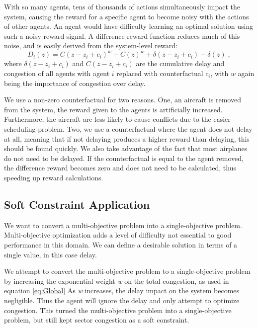 \documentclass{aamas2014}
\begin{document}
With so many agents, tens of thousands of actions simultaneously impact the system, causing the reward for a specific agent to become noisy with the actions of other agents. An agent would have difficulty learning an optimal solution using such a noisy reward signal. A difference reward function reduces much of this noise, and is easily derived from the system-level reward:
%
\begin{equation}
D_i(z) = C(z-z_i + c_i)^w - C(z)^w + \delta(z-z_i + c_i) - \delta(z)\;,
\end{equation}
%
where \textit{$\delta(z-z_i + c_i)$} and \textit{$C(z-z_i + c_i)$} are the cumulative delay and congestion of all agents with agent $i$ replaced with counterfactual \textit{$c_i$}, with $w$ again being the importance of congestion over delay. 

We use a non-zero counterfactual for two reasons. One, an aircraft is removed from the system, the reward given to the agents is artificially increased. Furthermore, the aircraft are less likely to cause conflicts due to the easier scheduling problem. Two, we use a counterfactual where the agent does not delay at all, meaning that if not delaying produces a higher reward than delaying, this should be found quickly. We also take advantage of the fact that most airplanes do not need to be delayed. If the counterfactual is equal to the agent removed, the difference reward becomes zero and does not need to be calculated, thus speeding up reward calculations.

\subsection{Soft Constraint Application}

We want to convert a multi-objective problem into a single-objective problem. Multi-objective optimization adds a level of difficulty not essential to good performance in this domain. We can define a desirable solution in terms of a single value, in this case delay. 

We attempt to convert the multi-objective problem to a single-objective problem by increasing the exponential weight \textit{w} on the total congestion, as used in equation \ref{eq:Global} As \textit{w} increases, the delay impact on the system becomes negligible. Thus the agent will ignore the delay and only attempt to optimize congestion. This turned the multi-objective problem into a single-objective problem, but still kept sector congestion as a soft constraint.
\end{document}
